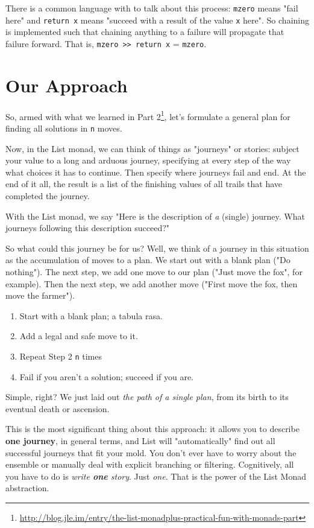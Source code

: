 \documentclass[]{article}
\renewcommand{\href}[2]{#2\footnote{\url{#1}}}
\begin{document}
There is a common language with to talk about this process: \texttt{mzero} means
"fail here" and \texttt{return\ x} means "succeed with a result of the value
\texttt{x} here". So chaining is implemented such that chaining anything to a
failure will propagate that failure forward. That is,
\texttt{mzero\ \textgreater{}\textgreater{}\ return\ x} = \texttt{mzero}.

\section{Our Approach}

So, armed with what we learned in
\href{http://blog.jle.im/entry/the-list-monadplus-practical-fun-with-monads-part}{Part
2}, let's formulate a general plan for finding all solutions in \texttt{n}
moves.

Now, in the List monad, we can think of things as "journeys" or stories: subject
your value to a long and arduous journey, specifying at every step of the way
what choices it has to continue. Then specify where journeys fail and end. At
the end of it all, the result is a list of the finishing values of all trails
that have completed the journey.

With the List monad, we say "Here is the description of \emph{a} (single)
journey. What journeys following this description succeed?"

So what could this journey be for us? Well, we think of a journey in this
situation as the accumulation of moves to a plan. We start out with a blank plan
("Do nothing"). The next step, we add one move to our plan ("Just move the fox",
for example). Then the next step, we add another move ("First move the fox, then
move the farmer").

\begin{enumerate}
\tightlist
\item
  Start with a blank plan; a tabula rasa.
\item
  Add a legal and safe move to it.
\item
  Repeat Step 2 \texttt{n} times
\item
  Fail if you aren't a solution; succeed if you are.
\end{enumerate}

Simple, right? We just laid out \emph{the path of a single plan}, from its birth
to its eventual death or ascension.

This is the most significant thing about this approach: it allows you to
describe \textbf{one journey}, in general terms, and List will "automatically"
find out all successful journeys that fit your mold. You don't ever have to
worry about the ensemble or manually deal with explicit branching or filtering.
Cognitively, all you have to do is \emph{write \textbf{one} story}. Just
\emph{one}. That is the power of the List Monad abstraction.
\end{document}
